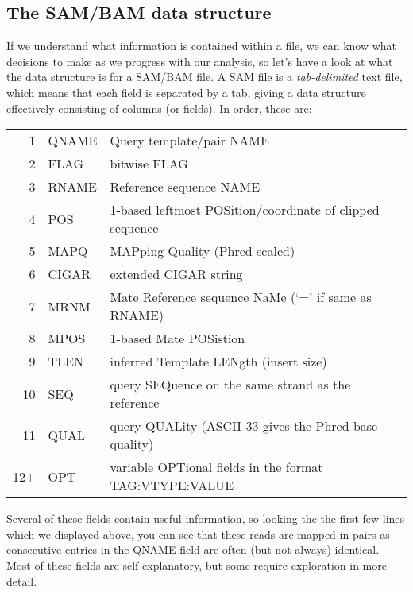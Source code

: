 \subsection{The SAM/BAM data structure}
\begin{information}
If we understand what information is contained within a file, we can know what decisions to make as we progress with our analysis, so let's have a look at what the data structure is for a SAM/BAM file.
A SAM file is a \textit{tab-delimited} text file, which means that each field is separated by a tab, giving a data structure effectively consisting of columns (or fields).
In order, these are: \\
\begin{tabular}{r l l}
1 & QNAME & Query template/pair NAME \\
2 & FLAG & bitwise FLAG \\
3 & RNAME & Reference sequence NAME \\
4 & POS & 1-based leftmost POSition/coordinate of clipped sequence \\
5 & MAPQ & MAPping Quality (Phred-scaled) \\
6 & CIGAR & extended CIGAR string \\
7 & MRNM & Mate Reference sequence NaMe (`=' if same as RNAME) \\
8 & MPOS & 1-based Mate POSistion \\
9 & TLEN & inferred Template LENgth (insert size) \\
10 & SEQ & query SEQuence on the same strand as the reference \\
11 & QUAL & query QUALity (ASCII-33 gives the Phred base quality) \\
12+ & OPT & variable OPTional fields in the format TAG:VTYPE:VALUE \\
\end{tabular}
\end{information}

\begin{note}
Several of these fields contain useful information, so looking the the first few lines which we displayed above, you can see that these reads are mapped in pairs as consecutive entries in the QNAME field are often (but not always) identical.
Most of these fields are self-explanatory, but some require exploration in more detail.
\end{note}

